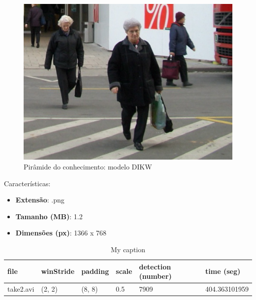 \begin{figure}[!htb]
	\centering
	\includegraphics[width=\linewidth]{img/vision/frame4.jpg}
	\caption{Pirâmide do conhecimento: modelo DIKW}
	\label{db}
\end{figure}


Características: 
\begin{itemize}
	\item \textbf{Extensão}: .png
	\item \textbf{Tamanho (MB)}: 1.2
	\item \textbf{Dimensões (px)}: 1366 x 768
\end{itemize}


\begin{table}[h]
	\centering
	\begin{tabular}{|l|l|l|l|l|l|}
		\hline
		\textbf{file} & \textbf{winStride} & \textbf{padding} & \textbf{scale} & \textbf{detection (number)} & \textbf{time (seg)} \\ \hline
		take2.avi & (2, 2) & (8, 8) & 0.5 & 7909 & 404.363101959 \\ \hline
		
		
	\end{tabular}
	\caption{My caption}
	\label{my-label}
\end{table}



